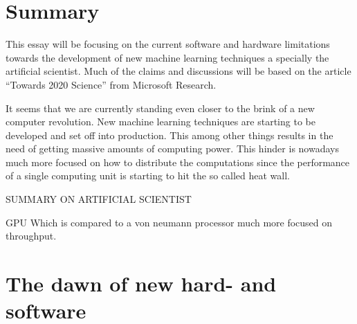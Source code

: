 \documentclass{article}
\begin{document}




%
%  
%
% 
%
%
% 


\section{Summary} %

    This essay will be focusing on the current software and hardware limitations
    towards the development of new machine learning techniques a specially the
    artificial scientist. Much of the claims and discussions will be based on
    the article ``Towards 2020 Science'' from Microsoft Research.\cite{ms2020}

    It seems that we are currently standing even closer to the brink of a new 
    computer revolution. New machine learning techniques are starting to be 
    developed and set off into production. This among other things results in
    the need of getting massive amounts of computing power.
    This hinder is nowadays much more focused on how to 
    distribute the computations
    since the performance of a single computing unit is starting to 
    hit the so called
    heat wall.\cite{ms2020}

    SUMMARY ON ARTIFICIAL SCIENTIST 


GPU Which is compared to a von neumann processor much more focused on throughput.

\section{The dawn of new hard- and software}
\end{document}
